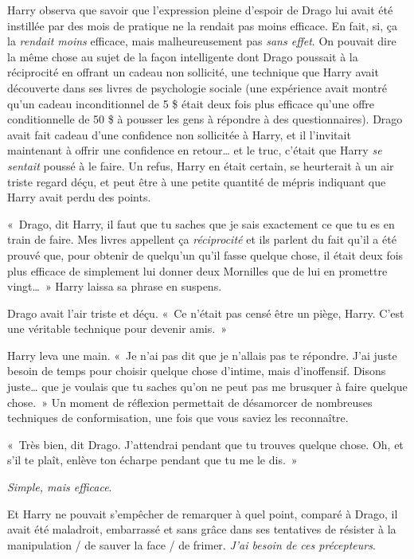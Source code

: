 Harry observa que savoir que l'expression pleine d'espoir de Drago lui avait été instillée par des mois de pratique ne la rendait pas moins efficace. En fait, si, ça la \emph{rendait moins} efficace, mais malheureusement pas \emph{sans effet}. On pouvait dire la même chose au sujet de la façon intelligente dont Drago poussait à la réciprocité en offrant un cadeau non sollicité, une technique que Harry avait découverte dans ses livres de psychologie sociale (une expérience avait montré qu'un cadeau inconditionnel de 5 \$ était deux fois plus efficace qu'une offre conditionnelle de 50 \$ à pousser les gens à répondre à des questionnaires). Drago avait fait cadeau d'une confidence non sollicitée à Harry, et il l'invitait maintenant à offrir une confidence en retour… et le truc, c'était que Harry \emph{se sentait} poussé à le faire. Un refus, Harry en était certain, se heurterait à un air triste regard déçu, et peut être à une petite quantité de mépris indiquant que Harry avait perdu des points.

«~Drago, dit Harry, il faut que tu saches que je sais exactement ce que tu es en train de faire. Mes livres appellent ça \emph{réciprocité} et ils parlent du fait qu'il a été prouvé que, pour obtenir de quelqu'un qu'il fasse quelque chose, il était deux fois plus efficace de simplement lui donner deux Mornilles que de lui en promettre vingt…~» Harry laissa sa phrase en suspens.

Drago avait l'air triste et déçu. «~Ce n'était pas censé être un piège, Harry. C'est une véritable technique pour devenir amis.~»

Harry leva une main. «~Je n'ai pas dit que je n'allais pas te répondre. J'ai juste besoin de temps pour choisir quelque chose d'intime, mais d'inoffensif. Disons juste… que je voulais que tu saches qu'on ne peut pas me brusquer à faire quelque chose.~» Un moment de réflexion permettait de désamorcer de nombreuses techniques de conformisation, une fois que vous saviez les reconnaître.

«~Très bien, dit Drago. J'attendrai pendant que tu trouves quelque chose. Oh, et s'il te plaît, enlève ton écharpe pendant que tu me le dis.~»

\emph{Simple, mais efficace}.

Et Harry ne pouvait s'empêcher de remarquer à quel point, comparé à Drago, il avait été maladroit, embarrassé et sans grâce dans ses tentatives de résister à la manipulation / de sauver la face / de frimer. \emph{J'ai besoin de ces précepteurs}.

